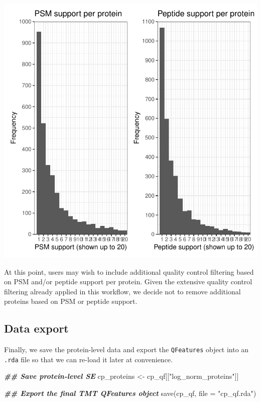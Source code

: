 \documentclass[9pt,a4paper,]{extarticle}
\newenvironment{Shaded}{\begin{snugshade}}{\end{snugshade}}
\newcommand{\AttributeTok}[1]{\textcolor[rgb]{0.77,0.63,0.00}{#1}}
\newcommand{\DocumentationTok}[1]{\textcolor[rgb]{0.56,0.35,0.01}{\textbf{\textit{#1}}}}
\newcommand{\FunctionTok}[1]{\textcolor[rgb]{0.00,0.00,0.00}{#1}}
\newcommand{\NormalTok}[1]{#1}
\newcommand{\OtherTok}[1]{\textcolor[rgb]{0.56,0.35,0.01}{#1}}
\newcommand{\StringTok}[1]{\textcolor[rgb]{0.31,0.60,0.02}{#1}}
\begin{document}
\begin{center}\includegraphics[width=1\linewidth]{workflow_expressions_files/figure-latex/support_plots-1} \end{center}

At this point, users may wish to include additional quality control filtering
based on PSM and/or peptide support per protein. Given the extensive quality
control filtering already applied in this workflow, we decide not to remove
additional proteins based on PSM or peptide support.

\hypertarget{data-export}{%
\subsection{Data export}\label{data-export}}

Finally, we save the protein-level data and export the \texttt{QFeatures} object into
an \texttt{.rda} file so that we can re-load it later at convenience.

\begin{Shaded}
\begin{Highlighting}[]
\DocumentationTok{\#\# Save protein{-}level SE}
\NormalTok{cp\_proteins }\OtherTok{\textless{}{-}}\NormalTok{ cp\_qf[[}\StringTok{"log\_norm\_proteins"}\NormalTok{]]}

\DocumentationTok{\#\# Export the final TMT QFeatures object}
\FunctionTok{save}\NormalTok{(cp\_qf, }\AttributeTok{file =} \StringTok{"cp\_qf.rda"}\NormalTok{)}
\end{Highlighting}
\end{Shaded}
\end{document}

